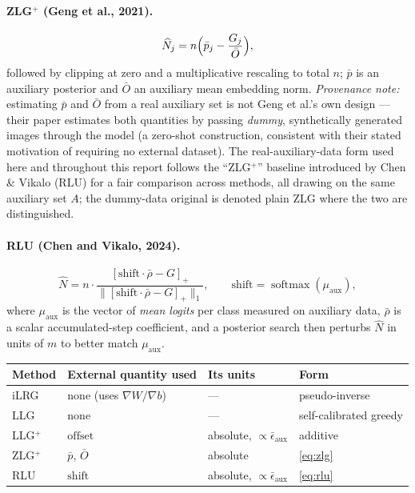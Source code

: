 \documentclass[11pt]{article}
\theoremstyle{remark}
\newcommand{\pos}[1]{\left[#1\right]_+}
\DeclareMathOperator{\softmax}{softmax}
\begin{document}
\paragraph{ZLG$^+$ (Geng et al., 2021).}
\begin{equation}
 \widehat N_j = n\Bigl(\bar p_j - \frac{G_j}{\bar O}\Bigr),
 \label{eq:zlg}
\end{equation}
followed by clipping at zero and a multiplicative rescaling to total $n$;
$\bar p$ is an auxiliary posterior and $\bar O$ an auxiliary mean embedding
norm. \emph{Provenance note:} estimating $\bar p$ and $\bar O$ from a real
auxiliary set is not Geng et al.'s own design --- their paper estimates
both quantities by passing \emph{dummy}, synthetically generated images
through the model (a zero-shot construction, consistent with their stated
motivation of requiring no external dataset). The real-auxiliary-data form
used here and throughout this report follows the ``ZLG$^+$'' baseline
introduced by Chen \& Vikalo (RLU) for a fair comparison across methods,
all drawing on the same auxiliary set $A$; the dummy-data original is
denoted plain ZLG where the two are distinguished.

\paragraph{RLU (Chen and Vikalo, 2024).}
\begin{equation}
 \widehat N = n \cdot \frac{\pos{\mathrm{shift}\cdot\bar\rho - G}}
                           {\bigl\|\pos{\mathrm{shift}\cdot\bar\rho - G}\bigr\|_1},
 \qquad \mathrm{shift} = \softmax(\mu_{\mathrm{aux}}),
 \label{eq:rlu}
\end{equation}
where $\mu_{\mathrm{aux}}$ is the vector of \emph{mean logits} per class
measured on auxiliary data, $\bar\rho$ is a scalar accumulated-step
coefficient, and a posterior search then perturbs $\widehat N$ in units of
$m$ to better match $\mu_{\mathrm{aux}}$.

\begin{center}
\begin{tabular}{llll}
\toprule
Method & External quantity used & Its units & Form \\
\midrule
iLRG      & none (uses $\nabla W/\nabla b$) & --- & pseudo-inverse \\
LLG       & none                            & --- & self-calibrated greedy \\
LLG$^+$   & $\mathrm{offset}$               & absolute, $\propto \bar\epsilon_{\mathrm{aux}}$ & additive \\
ZLG$^+$   & $\bar p$, $\bar O$              & absolute                                        & \eqref{eq:zlg} \\
RLU       & $\mathrm{shift}$                & absolute, $\propto \bar\epsilon_{\mathrm{aux}}$ & \eqref{eq:rlu} \\
\bottomrule
\end{tabular}
\end{center}
\end{document}
